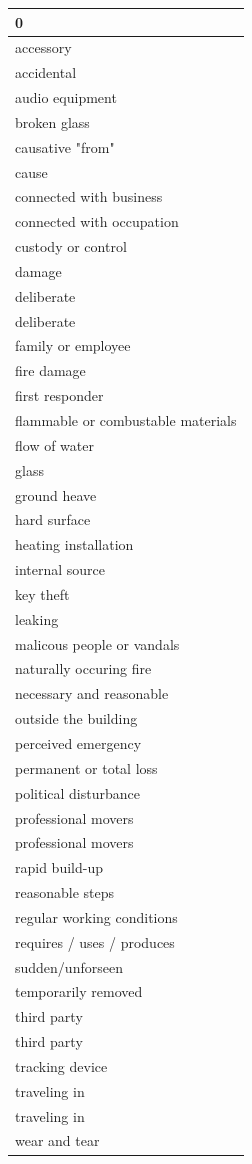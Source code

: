 \begin{tabular}{l}
\toprule
0 \\
\midrule
accessory \\
accidental  \\
audio equipment \\
broken glass \\
causative "from" \\
cause \\
connected with business \\
connected with occupation \\
custody or control \\
damage \\
deliberate \\
deliberate  \\
family or employee \\
fire damage \\
first responder \\
flammable or combustable materials \\
flow of water  \\
glass \\
ground heave \\
hard surface \\
heating installation  \\
internal source  \\
key theft  \\
leaking  \\
malicous people or vandals  \\
naturally occuring fire \\
necessary and reasonable \\
outside the building \\
perceived emergency \\
permanent or total loss  \\
political disturbance  \\
professional movers \\
professional movers  \\
rapid build-up \\
reasonable steps \\
regular working conditions \\
requires / uses / produces \\
sudden/unforseen  \\
temporarily removed \\
third party \\
third party  \\
tracking device \\
traveling in \\
traveling in  \\
wear and tear \\
\bottomrule
\end{tabular}
